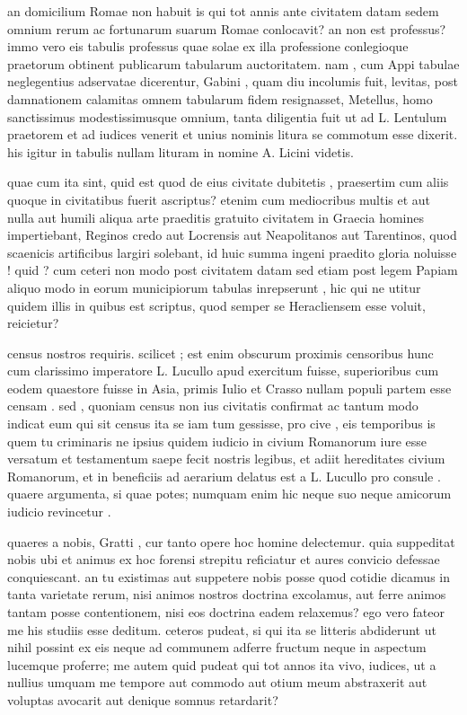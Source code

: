  an domicilium Romae non habuit is qui tot annis ante civitatem datam sedem omnium rerum ac fortunarum suarum Romae conlocavit? an non est professus? immo vero eis tabulis professus quae solae ex illa professione conlegioque praetorum obtinent publicarum tabularum auctoritatem. nam , cum Appi tabulae neglegentius adservatae dicerentur, Gabini , quam diu incolumis fuit, levitas, post damnationem calamitas omnem tabularum fidem resignasset, Metellus, homo sanctissimus modestissimusque omnium, tanta diligentia fuit ut ad L. Lentulum praetorem et ad iudices venerit et unius nominis litura se commotum esse dixerit. his igitur in tabulis nullam lituram in nomine A. Licini videtis.

 quae cum ita sint, quid est quod de eius civitate dubitetis , praesertim cum aliis quoque in civitatibus fuerit ascriptus? etenim cum mediocribus multis et aut nulla aut humili aliqua arte praeditis gratuito civitatem in Graecia homines impertiebant, Reginos credo aut Locrensis aut Neapolitanos aut Tarentinos, quod scaenicis artificibus largiri solebant, id huic summa ingeni praedito gloria noluisse ! quid ? cum ceteri non modo post civitatem datam sed etiam post legem Papiam aliquo modo in eorum municipiorum tabulas inrepserunt , hic qui ne utitur quidem illis in quibus est scriptus, quod semper se Heracliensem esse voluit, reicietur?

 census nostros requiris. scilicet ; est enim obscurum proximis censoribus hunc cum clarissimo imperatore L. Lucullo apud exercitum fuisse, superioribus cum eodem quaestore fuisse in Asia, primis Iulio et Crasso nullam populi partem esse censam . sed , quoniam census non ius civitatis confirmat ac tantum modo indicat eum qui sit census ita se iam tum gessisse, pro cive , eis temporibus is quem tu criminaris ne ipsius quidem iudicio in civium Romanorum iure esse versatum et testamentum saepe fecit nostris legibus, et adiit hereditates civium Romanorum, et in beneficiis ad aerarium delatus est a L. Lucullo pro consule . quaere argumenta, si quae potes; numquam enim hic neque suo neque amicorum iudicio revincetur .

 quaeres a nobis, Gratti , cur tanto opere hoc homine delectemur. quia suppeditat nobis ubi et animus ex hoc forensi strepitu reficiatur et aures convicio defessae conquiescant. an tu existimas aut suppetere nobis posse quod cotidie dicamus in tanta varietate rerum, nisi animos nostros doctrina excolamus, aut ferre animos tantam posse contentionem, nisi eos doctrina eadem relaxemus? ego vero fateor me his studiis esse deditum. ceteros pudeat, si qui ita se litteris abdiderunt ut nihil possint ex eis neque ad communem adferre fructum neque in aspectum lucemque proferre; me autem quid pudeat qui tot annos ita vivo, iudices, ut a nullius umquam me tempore aut commodo aut otium meum abstraxerit aut voluptas avocarit aut denique somnus retardarit?

